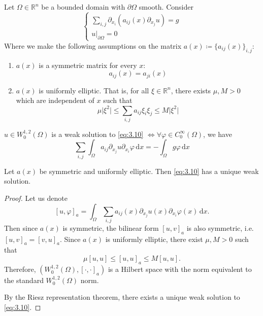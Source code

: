 \documentclass{report}
\begin{document}
\begin{example}{}{}
    Let \(\Omega \in \mathbb{R}^{n}\) be a bounded domain with \(\partial \Omega\) smooth. Consider
    \begin{equation}\label{eq:3.10}
        \begin{cases}
            \sum_{i, j} \partial_{x_{i}}(a_{ij}(x)\partial_{x_{j}}u) = g \\
            \left. u \right|_{\partial \Omega} = 0
        \end{cases}
    \end{equation}
    Where we make the following assumptions on the matrix \(a(x) \coloneqq \{a_{ij}(x)\}_{i,j}\):
    \begin{enumerate}
        \item \(a(x)\) is a symmetric matrix for every \(x\): 
        \[a_{ij}(x) = a_{ji}(x)\]
        \item \(a(x)\) is uniformly elliptic. That is, for all \(\xi \in \mathbb{R}^{n}\), there exists \(\mu, M > 0\) which are independent of \(x\) such that
        \[
            \mu \vert \xi^{2} \vert \leq \sum_{i,j} a_{ij} \xi_{i} \xi_{j} \leq M \vert \xi^{2} \vert 
        \]
    \end{enumerate} 
\end{example}

\begin{definition}{}{}
    \(u \in W^{1, 2}_{0}(\Omega)\) is a weak solution to \ref{eq:3.10} \(\iff \forall \varphi \in C^{\infty}_{0}(\Omega)\), we have 
    \[
        \sum_{i,j} \int_{\Omega} a_{ij} \partial_{x_{j}} u \partial_{x_{i}} \varphi \,\mathrm{d}x = -\int_{\Omega} g\varphi \,\mathrm{d}x
    \]
\end{definition}

\begin{theorem}{}{}
    Let \(a(x)\) be symmetric and uniformly elliptic. Then \ref{eq:3.10} has a unique weak solution.
\end{theorem}

\begin{proof}
    Let us denote
    \[
        [u, \varphi]_{a} = \int_{\Omega} \sum_{i,j} a_{ij}(x) \partial_{x_{j}} u(x) \partial_{x_{i}} \varphi(x) \,\mathrm{d}x.
    \]
    Then since \(a(x)\) is symmetric, the bilinear form \([u, v]_{a}\) is also symmetric, i.e. \([u, v]_{a} = [v, u]_{a}\). Since \(a(x)\) is uniformly elliptic, there exist \(\mu, M > 0\) such that
    \[
        \mu[u, u] \leq [u, u]_{a} \leq M[u, u].
    \]
    Therefore, \(\left(W^{1, 2}_{0}(\Omega), [\cdot, \cdot]_{a}\right)\) is a Hilbert space with the norm equivalent to the standard \(W^{1, 2}_{0}(\Omega)\) norm.

    By the Riesz representation theorem, there exists a unique weak solution to \ref{eq:3.10}.
\end{proof}
\end{document}
